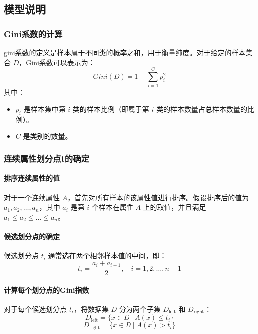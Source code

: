 \subsection{模型说明}
\subsubsection{Gini系数的计算}
gini系数的定义是样本属于不同类的概率之和，用于衡量纯度。对于给定的样本集合 \(D\)，Gini系数可以表示为：
\begin{equation}
	Gini(D) = 1 - \sum_{i=1}^{C} p_i^2
\end{equation}
其中：
\begin{itemize}
	\item \(p_i\) 是样本集中第 \(i\) 类的样本比例（即属于第 \(i\) 类的样本数量占总样本数量的比例）。
	\item \(C\) 是类别的数量。
\end{itemize}

\vspace*{1cm}



\subsubsection{连续属性划分点t的确定}

\paragraph{排序连续属性的值}
对于一个连续属性 \(A\)，首先对所有样本的该属性值进行排序。假设排序后的值为 \(a_1, a_2, \dots, a_n\)，其中 \(a_i\) 是第 \(i\) 个样本在属性 \(A\) 上的取值，并且满足 \(a_1 \leq a_2 \leq \dots \leq a_n\)。

\paragraph{候选划分点的确定}
候选划分点 \(t_i\) 通常选在两个相邻样本值的中间，即：
\begin{equation}
	t_i = \frac{a_i + a_{i+1}}{2}, \quad i = 1, 2, \dots, n-1
\end{equation}

\paragraph{计算每个划分点的Gini指数}
对于每个候选划分点 \(t_i\)，将数据集 \(D\) 分为两个子集 \(D_{\text{left}}\) 和 \(D_{\text{right}}\)：
\begin{equation}
	D_{\text{left}} = \{x \in D \mid A(x) \leq t_i\}
\end{equation}
\begin{equation}
	D_{\text{right}} = \{x \in D \mid A(x) > t_i\}
\end{equation}

